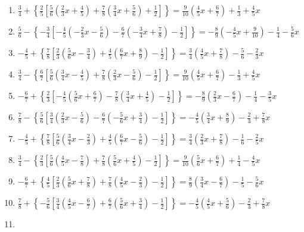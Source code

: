 \documentclass[12pt]{article}
\begin{document}
\begin{enumerate}
  \begin{enumerate}
  \def\labelenumii{\roman{enumii}.}
  \item
    \(\frac{3}{4}+\left\{\frac{2}{5}[\frac{5}{6}(\frac{2}{3}x+\frac{4}{5})+\frac{7}{8}(\frac{3}{4}x+\frac{5}{6})+\frac{1}{2}]\right\}=\frac{9}{10}(\frac{4}{5}x+\frac{6}{7})+\frac{1}{3}+\frac{4}{5}x\)
  \item
    \(\frac{5}{6}-\left\{-\frac{3}{4}[-\frac{4}{5}(-\frac{2}{3}x-\frac{5}{6})-\frac{6}{7}(-\frac{3}{4}x+\frac{7}{8})-\frac{1}{2}]\right\}=-\frac{8}{9}(-\frac{4}{5}x+\frac{9}{10})-\frac{1}{4}-\frac{5}{6}x\)
  \item
    \(-\frac{4}{5}+\left\{\frac{7}{8}[\frac{2}{3}(\frac{5}{6}x-\frac{3}{4})+\frac{4}{5}(\frac{6}{7}x+\frac{8}{9})-\frac{1}{2}]\right\}=\frac{3}{4}(\frac{4}{5}x+\frac{7}{8})-\frac{5}{6}-\frac{2}{3}x\)
  \item
    \(\frac{3}{4}-\left\{\frac{6}{7}[\frac{5}{6}(\frac{3}{4}x-\frac{4}{5})+\frac{7}{8}(\frac{2}{3}x-\frac{5}{6})-\frac{1}{2}]\right\}=\frac{9}{10}(\frac{4}{5}x+\frac{6}{7})-\frac{1}{3}+\frac{4}{5}x\)
  \item
    \(-\frac{6}{7}+\left\{\frac{2}{3}[-\frac{4}{5}(\frac{5}{6}x+\frac{6}{7})-\frac{7}{8}(\frac{3}{4}x+\frac{4}{5})-\frac{1}{2}]\right\}=-\frac{8}{9}(\frac{2}{3}x-\frac{6}{7})-\frac{1}{4}-\frac{3}{5}x\)
  \item
    \(\frac{7}{8}-\left\{\frac{5}{6}[\frac{3}{4}(\frac{2}{3}x-\frac{5}{6})-\frac{6}{7}(-\frac{5}{6}x+\frac{3}{4})-\frac{1}{2}]\right\}=-\frac{4}{5}(\frac{3}{4}x+\frac{8}{9})-\frac{2}{3}+\frac{7}{8}x\)
  \item
    \(-\frac{4}{5}+\left\{\frac{7}{8}[\frac{5}{6}(\frac{3}{4}x-\frac{2}{3})+\frac{4}{5}(\frac{6}{7}x-\frac{5}{6})-\frac{1}{2}]\right\}=\frac{3}{4}(\frac{2}{3}x+\frac{7}{8})-\frac{1}{6}-\frac{2}{5}x\)
  \item
    \(\frac{3}{4}-\left\{\frac{2}{3}[\frac{5}{6}(\frac{4}{5}x-\frac{7}{8})+\frac{7}{8}(\frac{5}{6}x+\frac{4}{5})-\frac{1}{2}]\right\}=\frac{9}{10}(\frac{5}{6}x+\frac{6}{7})+\frac{1}{4}-\frac{4}{5}x\)
  \item
    \(-\frac{6}{7}+\left\{\frac{4}{5}[\frac{2}{3}(\frac{5}{6}x+\frac{7}{8})+\frac{7}{8}(\frac{4}{5}x-\frac{2}{3})-\frac{1}{2}]\right\}=\frac{8}{9}(\frac{3}{4}x-\frac{6}{7})-\frac{1}{5}-\frac{5}{6}x\)
  \item
    \(\frac{7}{8}+\left\{-\frac{5}{6}[\frac{3}{4}(\frac{4}{5}x-\frac{6}{7})+\frac{6}{7}(\frac{5}{6}x+\frac{3}{4})-\frac{1}{2}]\right\}=-\frac{4}{5}(\frac{4}{5}x+\frac{5}{6})-\frac{2}{3}+\frac{7}{8}x\)
  \item

\end{enumerate}
\end{enumerate}
\end{document}
